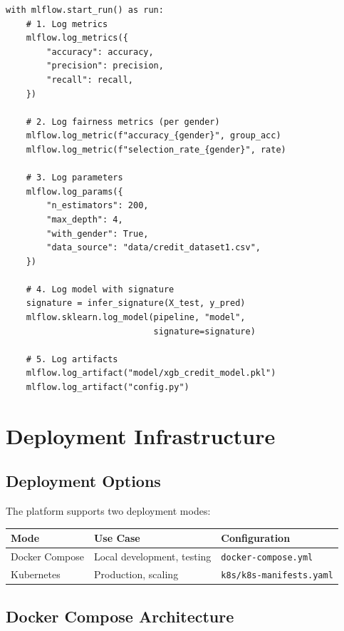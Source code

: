 \documentclass[11pt,a4paper]{article}
\begin{document}
\begin{lstlisting}[style=pythonstyle]
with mlflow.start_run() as run:
    # 1. Log metrics
    mlflow.log_metrics({
        "accuracy": accuracy,
        "precision": precision,
        "recall": recall,
    })

    # 2. Log fairness metrics (per gender)
    mlflow.log_metric(f"accuracy_{gender}", group_acc)
    mlflow.log_metric(f"selection_rate_{gender}", rate)

    # 3. Log parameters
    mlflow.log_params({
        "n_estimators": 200,
        "max_depth": 4,
        "with_gender": True,
        "data_source": "data/credit_dataset1.csv",
    })

    # 4. Log model with signature
    signature = infer_signature(X_test, y_pred)
    mlflow.sklearn.log_model(pipeline, "model",
                             signature=signature)

    # 5. Log artifacts
    mlflow.log_artifact("model/xgb_credit_model.pkl")
    mlflow.log_artifact("config.py")
\end{lstlisting}

\section{Deployment Infrastructure}

\subsection{Deployment Options}

The platform supports two deployment modes:

\begin{table}[H]
\centering
\begin{tabular}{@{}lll@{}}
\toprule
\textbf{Mode} & \textbf{Use Case} & \textbf{Configuration} \\
\midrule
Docker Compose & Local development, testing & \texttt{docker-compose.yml} \\
Kubernetes & Production, scaling & \texttt{k8s/k8s-manifests.yaml} \\
\bottomrule
\end{tabular}
\end{table}

\subsection{Docker Compose Architecture}
\end{document}
